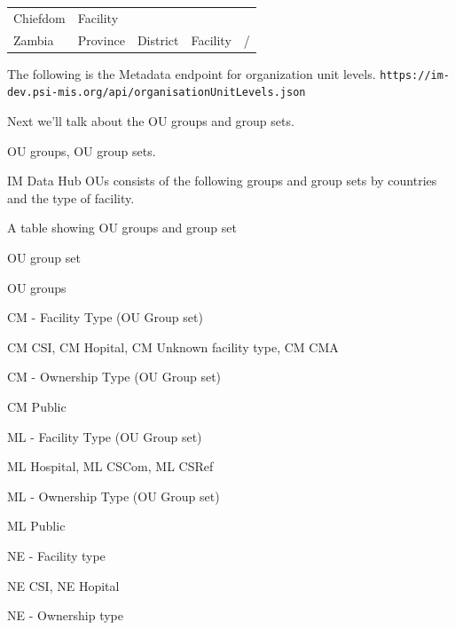\documentclass[]{book}
\begin{document}
\begin{longtable}[]{@{}lllll@{}}
\begin{minipage}[t]{0.20\columnwidth}
Chiefdom\strut
\end{minipage} & \begin{minipage}[t]{0.20\columnwidth}\raggedright
Facility\strut
\end{minipage}\tabularnewline
\begin{minipage}[t]{0.07\columnwidth}\raggedright
Zambia\strut
\end{minipage} & \begin{minipage}[t]{0.20\columnwidth}\raggedright
Province\strut
\end{minipage} & \begin{minipage}[t]{0.20\columnwidth}\raggedright
District\strut
\end{minipage} & \begin{minipage}[t]{0.20\columnwidth}\raggedright
Facility\strut
\end{minipage} & \begin{minipage}[t]{0.20\columnwidth}\raggedright
/\strut
\end{minipage}\tabularnewline
\bottomrule
\end{longtable}

The following is the Metadata endpoint for organization unit levels.
\texttt{https://im-dev.psi-mis.org/api/organisationUnitLevels.json}

Next we'll talk about the OU groups and group sets.

OU groups, OU group sets.

IM Data Hub OUs consists of the following groups and group sets by countries and the type of facility.

\label{tab:unnamed-chunk-13}A table showing OU groups and group set

OU group set

OU groups

CM - Facility Type (OU Group set)

CM CSI, CM Hopital, CM Unknown facility type, CM CMA

CM - Ownership Type (OU Group set)

CM Public

ML - Facility Type (OU Group set)

ML Hospital, ML CSCom, ML CSRef

ML - Ownership Type (OU Group set)

ML Public

NE - Facility type

NE CSI, NE Hopital

NE - Ownership type
\end{document}
